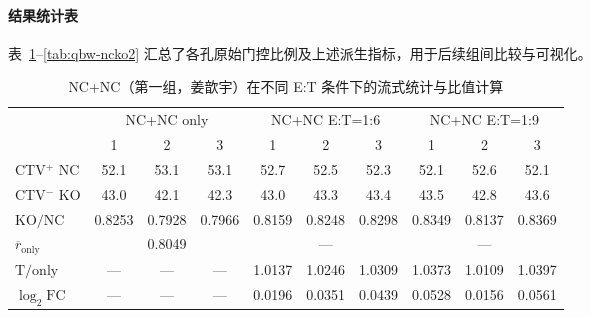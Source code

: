 \paragraph{结果统计表}
表~\ref{tab:jxy-ncnc}--\ref{tab:qbw-ncko2} 汇总了各孔原始门控比例及上述派生指标，用于后续组间比较与可视化。

\begin{table}[H]
    \centering
    \caption{NC+NC（第一组，姜歆宇）在不同 E:T 条件下的流式统计与比值计算}
    \label{tab:jxy-ncnc}
    \begin{tabular}{lccccccccc}
        \toprule
        & \multicolumn{3}{c}{NC+NC only}
        & \multicolumn{3}{c}{NC+NC E:T=1:6}
        & \multicolumn{3}{c}{NC+NC E:T=1:9} \\
        \cmidrule(lr){2-4}\cmidrule(lr){5-7}\cmidrule(lr){8-10}
        & 1 & 2 & 3 & 1 & 2 & 3 & 1 & 2 & 3 \\
        \midrule
        CTV$^+$ NC  & 52.1 & 53.1 & 53.1 & 52.7 & 52.5 & 52.3 & 52.1 & 52.6 & 52.1 \\
        CTV$^{-}$ KO  & 43.0 & 42.1 & 42.3 & 43.0 & 43.3 & 43.4 & 43.5 & 42.8 & 43.6 \\
        \midrule
        $\mathrm{KO/NC}$    & 0.8253 & 0.7928 & 0.7966 & 0.8159 & 0.8248 & 0.8298 & 0.8349 & 0.8137 & 0.8369 \\
        $\overline{r}_{\mathrm{only}}$ & \multicolumn{3}{c}{0.8049} & \multicolumn{3}{c}{---} & \multicolumn{3}{c}{---} \\
        \midrule
        $\mathrm{T/only}$   & ---  & ---  & --- & 1.0137 & 1.0246 & 1.0309 & 1.0373 & 1.0109 & 1.0397 \\
        $\log_2 \mathrm{FC}$   & ---  & ---  & --- & 0.0196 & 0.0351 & 0.0439 & 0.0528 & 0.0156 & 0.0561 \\
        \bottomrule
    \end{tabular}
\end{table}

